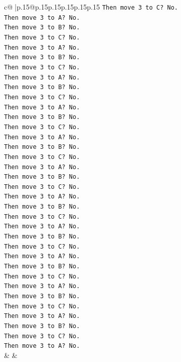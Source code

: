 \documentclass{article}
\begin{document}
{\begin{supertabular}{c@{$\;$}|p{.15\linewidth}@{}p{.15\linewidth}p{.15\linewidth}p{.15\linewidth}p{.15\linewidth}p{.15\linewidth}}
{{{\texttt{Then move 3 to C? No.} \\
\texttt{Then move 3 to A? No.} \\
\texttt{Then move 3 to B? No.} \\
\texttt{Then move 3 to C? No.} \\
\texttt{Then move 3 to A? No.} \\
\texttt{Then move 3 to B? No.} \\
\texttt{Then move 3 to C? No.} \\
\texttt{Then move 3 to A? No.} \\
\texttt{Then move 3 to B? No.} \\
\texttt{Then move 3 to C? No.} \\
\texttt{Then move 3 to A? No.} \\
\texttt{Then move 3 to B? No.} \\
\texttt{Then move 3 to C? No.} \\
\texttt{Then move 3 to A? No.} \\
\texttt{Then move 3 to B? No.} \\
\texttt{Then move 3 to C? No.} \\
\texttt{Then move 3 to A? No.} \\
\texttt{Then move 3 to B? No.} \\
\texttt{Then move 3 to C? No.} \\
\texttt{Then move 3 to A? No.} \\
\texttt{Then move 3 to B? No.} \\
\texttt{Then move 3 to C? No.} \\
\texttt{Then move 3 to A? No.} \\
\texttt{Then move 3 to B? No.} \\
\texttt{Then move 3 to C? No.} \\
\texttt{Then move 3 to A? No.} \\
\texttt{Then move 3 to B? No.} \\
\texttt{Then move 3 to C? No.} \\
\texttt{Then move 3 to A? No.} \\
\texttt{Then move 3 to B? No.} \\
\texttt{Then move 3 to C? No.} \\
\texttt{Then move 3 to A? No.} \\
\texttt{Then move 3 to B? No.} \\
\texttt{Then move 3 to C? No.} \\
\texttt{Then move 3 to A? No.} \\
            }
        }
    }
    & & \\ \\


\end{supertabular}}
\end{document}
